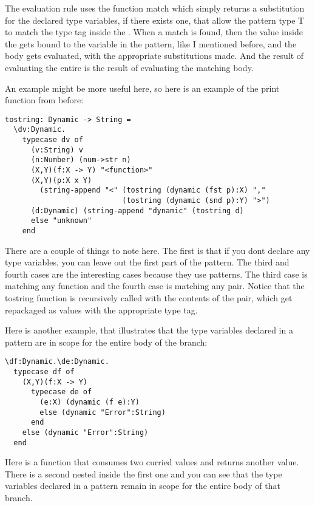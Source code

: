 \documentclass[12pt]{article}	%
\begin{document}
The evaluation rule uses the function match which simply returns a substitution for the declared type variables, if there exists one, that allow the pattern type T to match the type tag inside the \Dynamic. When a match is found, then the value inside the \Dynamic gets bound to the variable in the pattern, like I mentioned before, and the body gets evaluated, with the appropriate substitutions made. And the result of evaluating the entire \typecase is the result of evaluating the matching body.

An example might be more useful here, so here is an example of the print function from before:

\begin{verbatim}
tostring: Dynamic -> String = 
  \dv:Dynamic.
    typecase dv of
      (v:String) v
      (n:Number) (num->str n)
      (X,Y)(f:X -> Y) "<function>"
      (X,Y)(p:X x Y)
        (string-append "<" (tostring (dynamic (fst p):X) ","
                           (tostring (dynamic (snd p):Y) ">")
      (d:Dynamic) (string-append "dynamic" (tostring d)
      else "unknown"
    end
\end{verbatim}

There are a couple of things to note here. The first is that if you dont declare any type variables, you can leave out the first part of the pattern. The third and fourth cases are the interesting cases because they use patterns. The third case is matching any function and the fourth case is matching any pair. Notice that the tostring function is recursively called with the contents of the pair, which get repackaged as \Dynamic values with the appropriate type tag.

Here is another example, that illustrates that the type variables declared in a pattern are in scope for the entire body of the branch:

\begin{verbatim}
\df:Dynamic.\de:Dynamic.
  typecase df of
    (X,Y)(f:X -> Y)
      typecase de of
        (e:X) (dynamic (f e):Y)
        else (dynamic "Error":String)
      end
    else (dynamic "Error":String)
  end
\end{verbatim}

Here is a function that consumes two curried \Dynamic values and returns another \Dynamic value. There is a second \typecase nested inside the first one and you can see that the type variables declared in a pattern remain in scope for the entire body of that branch.
\end{document}
